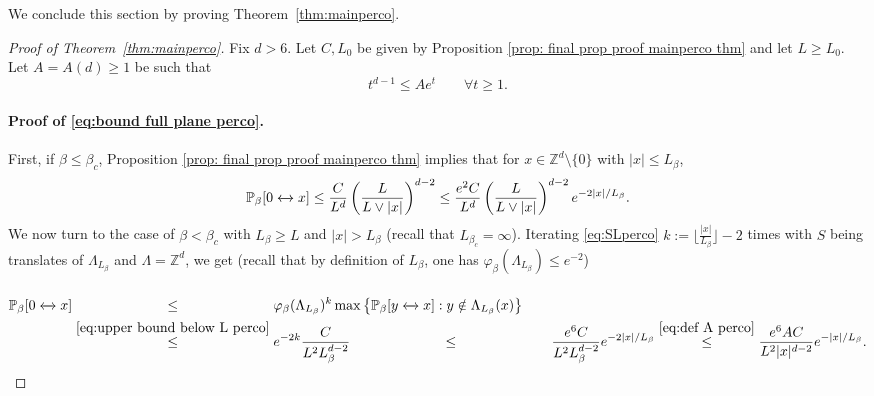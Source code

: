 \documentclass[11pt,a4paper]{article}
\numberwithin{equation}{section}
\theoremstyle{plain}
\theoremstyle{definition}
\newcommand{\connect}{\xleftrightarrow}
\begin{document}
We conclude this section by proving Theorem~\ref{thm:mainperco}.

\begin{proof}[Proof of Theorem~\textup{\ref{thm:mainperco}}] Fix $d>6$. Let $C,L_0$ be given by Proposition \ref{prop: final prop proof mainperco thm} and let $L\geq L_0$.
Let $A=A(d)\geq 1$ be such that 
\begin{equation}\label{eq:def A perco}
t^{d-1}\leq Ae^{t}\qquad   \forall t\geq 1.
\end{equation}
\paragraph{Proof of \eqref{eq:bound full plane perco}.}
First, if $\beta\leq \beta_c$,
Proposition \ref{prop: final prop proof mainperco thm} implies that for $x\in \mathbb Z^d\setminus \{0\}$ with $|x|\le L_\beta$,
\begin{equation}\label{eq: proof nearcritical full space 0 perco}
	\mathbb P_\beta[0\connect{}x]\leq \frac{C}{L^d}\left(\frac{L}{L\vee |x|}\right)^{d-2}\leq \frac{e^2C}{L^d}\left(\frac{L}{L\vee |x|}\right)^{d-2}e^{-2|x|/L_\beta}.
\end{equation}
We now turn to the case of $\beta<\beta_c$ with $L_\beta\geq L$ and $|x|>L_\beta$ (recall that $L_{\beta_c}=\infty$). Iterating \eqref{eq:SLperco} $k:=\lfloor \tfrac{|x|}{L_\beta}\rfloor-2$ times with $S$ being translates of $\Lambda_{L_\beta}$ and $\Lambda=\mathbb Z^d$, we get (recall that by definition of $L_\beta$, one has $\varphi_\beta(\Lambda_{L_\beta})\leq e^{-2}$) 
\begin{align}\label{eq:iterateperco}
\mathbb P_\beta[0\connect{}x]&\stackrel{\phantom{\eqref{eq:upper bound below L perco}}}\le \varphi_\beta(\Lambda_{L_\beta})^k \max\big\{\mathbb P_\beta[y\connect{}x]:y\notin\Lambda_{L_\beta}(x)\big\}\\&\stackrel{\eqref{eq:upper bound below L perco}}\leq e^{-2k}\frac{C}{L^2L_\beta^{d-2}}\stackrel{\phantom{\eqref{eq:upper bound below L perco}}}\leq \frac{e^6C}{L^2L_\beta^{d-2}}e^{-2|x|/L_\beta}
\stackrel{\eqref{eq:def A perco}}\leq \frac{e^6AC}{L^2|x|^{d-2}}e^{-|x|/L_\beta}.\label{eq: proof nearcritical full space perco}
\end{align}

\end{proof}
\end{document}
